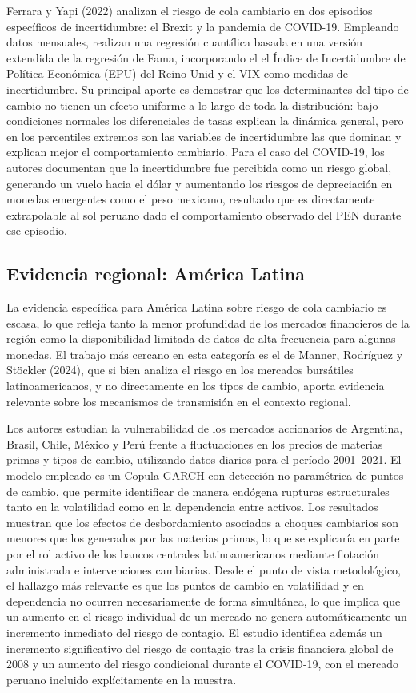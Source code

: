 ﻿\documentclass[11pt,a4paper]{article}
\begin{document}
Ferrara y Yapi (2022) analizan el riesgo de cola cambiario en dos episodios específicos de incertidumbre: el Brexit y la pandemia de COVID-19. Empleando datos mensuales, realizan una regresión cuantílica basada en una versión extendida de la regresión de Fama, incorporando el el Índice de Incertidumbre de Política Económica (EPU) del Reino Unid y el VIX como medidas de incertidumbre. Su principal aporte es demostrar que los determinantes del tipo de cambio no tienen un efecto uniforme a lo largo de toda la distribución: bajo condiciones normales los diferenciales de tasas explican la dinámica general, pero en los percentiles extremos son las variables de incertidumbre las que dominan y explican mejor el comportamiento cambiario. Para el caso del COVID-19, los autores documentan que la incertidumbre fue percibida como un riesgo global, generando un vuelo hacia el dólar y aumentando los riesgos de depreciación en monedas emergentes como el peso mexicano, resultado que es directamente extrapolable al sol peruano dado el comportamiento observado del PEN durante ese episodio.

\subsection{Evidencia regional: América Latina}

La evidencia específica para América Latina sobre riesgo de cola cambiario es escasa, lo que refleja tanto la menor profundidad de los mercados financieros de la región como la disponibilidad limitada de datos de alta frecuencia para algunas monedas. El trabajo más cercano en esta categoría es el de Manner, Rodríguez y Stöckler (2024), que si bien analiza el riesgo en los mercados bursátiles latinoamericanos, y no directamente en los tipos de cambio, aporta evidencia relevante sobre los mecanismos de transmisión en el contexto regional.


Los autores estudian la vulnerabilidad de los mercados accionarios de Argentina, Brasil, Chile, México y Perú frente a fluctuaciones en los precios de materias primas y tipos de cambio, utilizando datos diarios para el período 2001–2021. El modelo empleado es un Copula-GARCH con detección no paramétrica de puntos de cambio, que permite identificar de manera endógena rupturas estructurales tanto en la volatilidad como en la dependencia entre activos. Los resultados muestran que los efectos de desbordamiento asociados a choques cambiarios son menores que los generados por las materias primas, lo que se explicaría en parte por el rol activo de los bancos centrales latinoamericanos mediante flotación administrada e intervenciones cambiarias. Desde el punto de vista metodológico, el hallazgo más relevante es que los puntos de cambio en volatilidad y en dependencia no ocurren necesariamente de forma simultánea, lo que implica que un aumento en el riesgo individual de un mercado no genera automáticamente un incremento inmediato del riesgo de contagio. El estudio identifica además un incremento significativo del riesgo de contagio tras la crisis financiera global de 2008 y un aumento del riesgo condicional durante el COVID-19, con el mercado peruano incluido explícitamente en la muestra.
\end{document}
